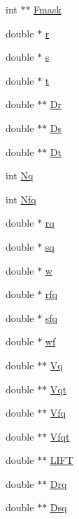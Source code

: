 \begin{DoxyCompactItemize}
int $\ast$$\ast$ \hyperlink{structfoo_a87f705f70f2c44cadfb5f5c483c3cdba}{Fmask}
\item 
double $\ast$ \hyperlink{structfoo_a8532cd651cdeaf8abb631238ab86f4ac}{r}
\item 
double $\ast$ \hyperlink{structfoo_ac7d53a0cc609b21ce1424362a76ab3d2}{s}
\item 
double $\ast$ \hyperlink{structfoo_a157d3ae633cb9f4f81489266b49d7b14}{t}
\item 
double $\ast$$\ast$ \hyperlink{structfoo_a1d5e78f13c14db08bdb723072c238385}{Dr}
\item 
double $\ast$$\ast$ \hyperlink{structfoo_abbe79be26c90f302f000690d63bbd09a}{Ds}
\item 
double $\ast$$\ast$ \hyperlink{structfoo_aff42bfa38007796fc574c66972d14a27}{Dt}
\item 
int \hyperlink{structfoo_ae6129d2b6c59891b39510d564c6737d3}{Nq}
\item 
int \hyperlink{structfoo_a7a04751d8fc3d116c52711fe0bf3b97a}{Nfq}
\item 
double $\ast$ \hyperlink{structfoo_a35c4afa14e15761e0981ffe78ed235ab}{rq}
\item 
double $\ast$ \hyperlink{structfoo_aeec6512aa53717de5bf1eabcd616fec8}{sq}
\item 
double $\ast$ \hyperlink{structfoo_a5bc4c01871b40440a476784c819f336b}{w}
\item 
double $\ast$ \hyperlink{structfoo_a6e2cc6e126c113d2663ade1c7b78c69e}{rfq}
\item 
double $\ast$ \hyperlink{structfoo_ad9fe637fcfdeec9b790675db65539532}{sfq}
\item 
double $\ast$ \hyperlink{structfoo_aee14e19ceed59c5a6fbd91e2568531c9}{wf}
\item 
double $\ast$$\ast$ \hyperlink{structfoo_a5d82057235890371191110f5a975c0b0}{Vq}
\item 
double $\ast$$\ast$ \hyperlink{structfoo_a8538b025996654bf7e112be3db90bede}{Vqt}
\item 
double $\ast$$\ast$ \hyperlink{structfoo_a0c0c855f842f7fdc35764d378b8bbcd2}{Vfq}
\item 
double $\ast$$\ast$ \hyperlink{structfoo_a596f6707ac27acbad5fa5ab411537af1}{Vfqt}
\item 
double $\ast$$\ast$ \hyperlink{structfoo_ac21f11341b51596de4b5c1e0cb13d77b}{L\+I\+FT}
\item 
double $\ast$$\ast$ \hyperlink{structfoo_a6361146ff0a38e24d521f7d13900cde8}{Drq}
\item 
double $\ast$$\ast$ \hyperlink{structfoo_ac533e62ce1ea5e6372c56b44edfc113d}{Dsq}
$$
\end{DoxyCompactItemize}
